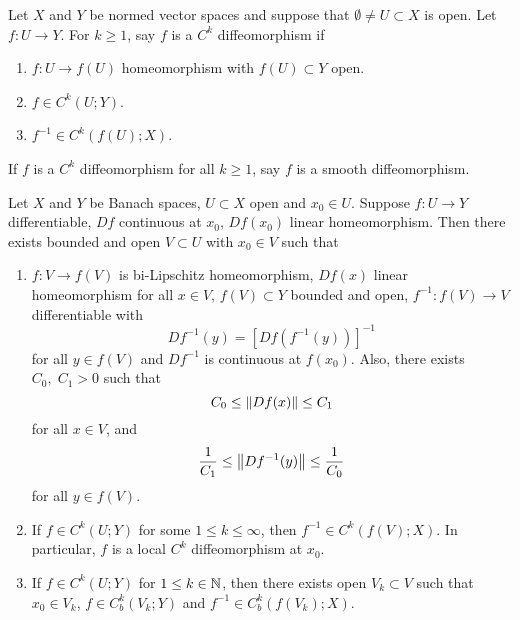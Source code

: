 \documentclass[a4paper]{article}
\begin{document}
\begin{defi}[diffeomorphism]
Let $X$ and $Y$ be normed vector spaces and suppose that 
$\emptyset \neq U \subset X$ is open. 
Let $f : U \to Y$. For $k \geq 1$, say $f$ is a 
$C^k$ diffeomorphism if 
\begin{enumerate}
  \item $f: U \to f(U)$ homeomorphism with $f(U) \subset Y$
  open. 
  \item $f \in C^k(U ; Y)$.
  \item $f^{-1} \in C^k(f(U); X)$.
\end{enumerate}
If $f$ is a $C^k$ diffeomorphism for all $k \geq 1$,
say $f$ is a smooth diffeomorphism.
\end{defi}

\begin{thm}
  Let $X$ and $Y$ be Banach spaces, $U \subset X$ open and 
  $x_0 \in U$. Suppose $f: U \to Y$ differentiable, 
  $Df$ continuous at $x_0$, $Df(x_0)$ linear homeomorphism.
  Then there exists bounded and open $V \subset U$ with 
  $x_0 \in V$ such that 
  \begin{enumerate}
    \item $f: V \to f(V)$ is bi-Lipschitz homeomorphism, 
    $Df(x)$ linear homeomorphism for all $x \in V$, 
    $f(V) \subset Y$ bounded and open, $f^{-1} : f(V) \to V$
    differentiable with 
    \[
    Df^{-1}(y) = [Df(f^{-1}(y))]^{-1}
    \]
    for all $y \in f(V)$ and $Df^{-1}$ is continuous 
    at $f(x_0)$. Also, there exists $C_0, \; C_1 > 0$
    such that 
    \[
    C_0 \leq \left\lVert Df(x)\right\rVert \leq C_1 
    \]
    for all $x \in V$, and 
    \[
    \frac{1}{C_1} \leq \left\lVert Df^{-1}(y)\right\rVert \leq \frac{1}{C_0}
    \]
    for all $y \in f(V)$.
    \item If $f \in C^k(U; Y)$ for some $1 \leq k \leq \infty$,
    then $f^{-1} \in C^k(f(V); X)$. In particular, 
    $f$ is a local $C^k$ diffeomorphism at $x_0$.
    \item If $f \in C^k(U; Y)$ for $1 \leq k \in \mathbb{N}$, then 
    there exists open $V_k \subset V$ such that $x_0 \in V_k$, 
    $f \in C^k_b(V_k ; Y)$ and $f^{-1} \in C^k_b(f(V_k) ; X)$.
  \end{enumerate}
\end{thm}
\end{document}

